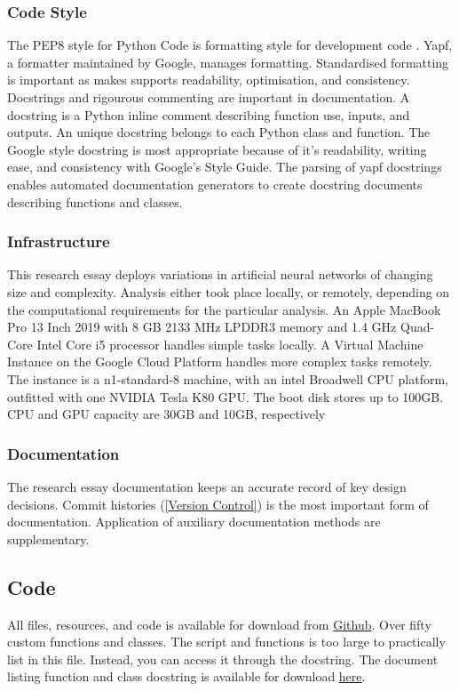 \documentclass[12pt]{article}
\begin{document}
\subsubsection{Code Style} \label{CS}
The PEP8 style for Python Code is formatting style for development code \cite{PEP8}.
Yapf, a formatter maintained by Google, manages formatting.
Standardised formatting is important as makes supports readability, optimisation, and consistency.
Docstrings and rigourous commenting are important in documentation.
A docstring is a Python inline comment describing function use, inputs, and outputs.
An unique docstring belongs to each Python class and function.
The Google style docstring is most appropriate because of it's readability, writing ease, and consistency with Google's Style Guide.
The parsing of yapf docstrings enables automated documentation generators to create docstring documents describing functions and classes.

\subsubsection{Infrastructure}
This research essay deploys variations in artificial neural networks of changing size and complexity.
Analysis either took place locally, or remotely, depending on the computational requirements for the particular analysis.
An Apple MacBook Pro 13 Inch 2019 with 8 GB 2133 MHz LPDDR3 memory and 1.4 GHz Quad-Core Intel Core i5 processor handles simple tasks locally.
A Virtual Machine Instance on the Google Cloud Platform handles more complex tasks remotely.
The instance is a n1-standard-8 machine, with an intel Broadwell CPU platform, outfitted with one NVIDIA Tesla K80 GPU.
The boot disk stores up to 100GB. CPU and GPU capacity are 30GB and 10GB, respectively

\subsubsection{Documentation}
The research essay documentation keeps an accurate record of key design decisions.
Commit histories (\ref{Version Control}) is the most important form of documentation.
Application of auxiliary documentation methods are supplementary.
\subsection{Code} \label{code}
All files, resources, and code is available for download from \href{https://github.com/CMCD1996/finance-honours}{Github}.
Over fifty custom functions and classes.
The script and functions is too large to practically list in this file. Instead, you can access it through the docstring.
The document listing function and class docstring is available for download \href{/Users/connor/Google Drive/Documents/Professional/Projects/Portfolio/downloads/cmcd398-finance-honours-code-listing.pdf}{here}.
\end{document}
